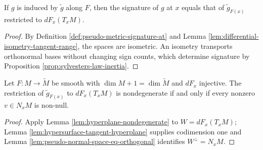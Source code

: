\begin{lemma}
\label{lem:submanifold-signature-in-ambient-fibre}
\leanok
{}
If $g$ is induced by $\widetilde g$ along $F$, then the signature of $g$ at $x$ equals that of $\widetilde g_{F(x)}$ restricted to $dF_x(T_xM)$.
\end{lemma}
\begin{proof}
\leanok
{}
\sketch By Definition \ref{def:pseudo-metric-signature-at} and Lemma \ref{lem:differential-isometry-tangent-range}, the spaces are isometric. An isometry transports orthonormal bases without changing sign counts, which determine signature by Proposition \ref{prop:sylvesters-law-inertia}.
\end{proof}

\begin{proposition}
\label{prop:pseudo-riemannian-hypersurface-nondegenerate}
\leanok
{}
Let $F:M\to\widetilde M$ be smooth with $\dim M+1=\dim\widetilde M$ and $dF_x$ injective. The restriction of $\widetilde g_{F(x)}$ to $dF_x(T_xM)$ is nondegenerate if and only if every nonzero $v\in N_xM$ is non-null.
\end{proposition}
\begin{proof}
\leanok
{}
\sketch Apply Lemma \ref{lem:hyperplane-nondegenerate} to $W=dF_x(T_xM)$; Lemma \ref{lem:hypersurface-tangent-hyperplane} supplies codimension one and Lemma \ref{lem:pseudo-normal-space-eq-orthogonal} identifies $W^\perp=N_xM$.
\end{proof}

